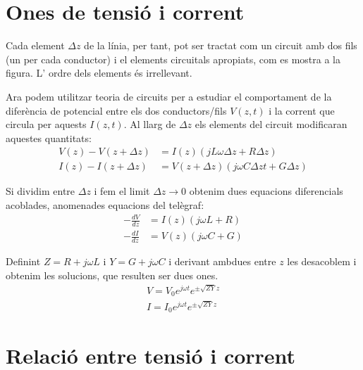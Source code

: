 \section{Ones de tensió i corrent}

Cada element $\Delta z$ de la línia, per tant, pot ser tractat com un circuit amb dos fils (un per cada conductor) i el elements circuitals apropiats, com es mostra a la figura. L' ordre dels elements és irrellevant.

Ara podem utilitzar teoria de circuits per a estudiar el comportament de la diferència de potencial entre els dos conductors/fils $V(z, t)$ i la corrent que circula per aquests $I(z, t)$. Al llarg de $\Delta z$ els elements del circuit modificaran aquestes quantitats:
\begin{subequations}
  \begin{align}
    V(z) - V(z + \Delta z) &= I(z) (j L \omega \Delta z + R \Delta z) \\
    I(z) - I(z + \Delta z) &= V(z + \Delta z) (j \omega C \Delta z t + G \Delta z)
  \end{align}
\end{subequations}

Si dividim entre $\Delta z$ i fem el limit $\Delta z \to 0$ obtenim dues equacions diferencials acoblades, anomenades equacions del telègraf:
\begin{subequations}
  \begin{align}
    - \frac{dV}{dz} &= I(z)(j\omega L + R ) \label{diffV} \\
    - \frac{dI}{dz} &= V(z)(j\omega C + G )
  \end{align}
\end{subequations}

Definint $Z = R + j \omega L $ i $ Y = G + j \omega C$ i derivant ambdues entre $z$ les desacoblem i obtenim les solucions, que resulten ser dues ones.
\begin{subequations}
  \begin{align}
    V = V _0 e^{j \omega t}e^{\pm \sqrt{ZY} z} \label{solV}\\
    I = I _0 e^{j \omega t}e^{\pm \sqrt{ZY} z} \label{solI}
  \end{align}
\end{subequations}


\section{Relació entre tensió i corrent}

